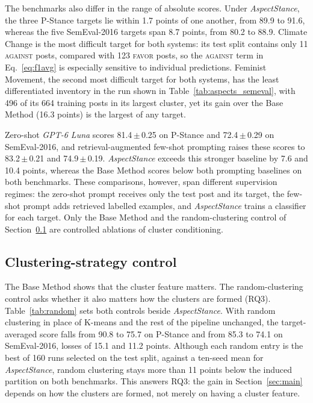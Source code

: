 \documentclass[pdflatex,sn-mathphys-num,iicol]{sn-jnl}%
\begin{document}
The benchmarks also differ in the range of absolute scores. Under \textit{AspectStance}, the three P-Stance targets lie within 1.7 points of one another, from 89.9 to 91.6, whereas the five SemEval-2016 targets span 8.7 points, from 80.2 to 88.9. Climate Change is the most difficult target for both systems: its test split contains only 11 \textsc{against} posts, compared with 123 \textsc{favor} posts, so the \textsc{against} term in Eq.~\eqref{eq:f1avg} is especially sensitive to individual predictions. Feminist Movement, the second most difficult target for both systems, has the least differentiated inventory in the run shown in Table~\ref{tab:aspects_semeval}, with 496 of its 664 training posts in its largest cluster, yet its gain over the Base Method (16.3 points) is the largest of any target.

Zero-shot \textit{GPT-6 Luna} scores 81.4\,\(\pm\)\,0.25 on P-Stance and 72.4\,\(\pm\)\,0.29 on SemEval-2016, and retrieval-augmented few-shot prompting raises these scores to 83.2\,\(\pm\)\,0.21 and 74.9\,\(\pm\)\,0.19. \textit{AspectStance} exceeds this stronger baseline by 7.6 and 10.4 points, whereas the Base Method scores below both prompting baselines on both benchmarks. These comparisons, however, span different supervision regimes: the zero-shot prompt receives only the test post and its target, the few-shot prompt adds retrieved labelled examples, and \textit{AspectStance} trains a classifier for each target. Only the Base Method and the random-clustering control of Section~\ref{sec:random} are controlled ablations of cluster conditioning.

\subsection{Clustering-strategy control}\label{sec:random}

The Base Method shows that the cluster feature matters. The random-clustering control asks whether it also matters how the clusters are formed (RQ3). Table~\ref{tab:random} sets both controls beside \textit{AspectStance}. With random clustering in place of K-means and the rest of the pipeline unchanged, the target-averaged score falls from 90.8 to 75.7 on P-Stance and from 85.3 to 74.1 on SemEval-2016, losses of 15.1 and 11.2 points. Although each random entry is the best of 160 runs selected on the test split, against a ten-seed mean for \textit{AspectStance}, random clustering stays more than 11 points below the induced partition on both benchmarks. This answers RQ3: the gain in Section~\ref{sec:main} depends on how the clusters are formed, not merely on having a cluster feature.
\end{document}
